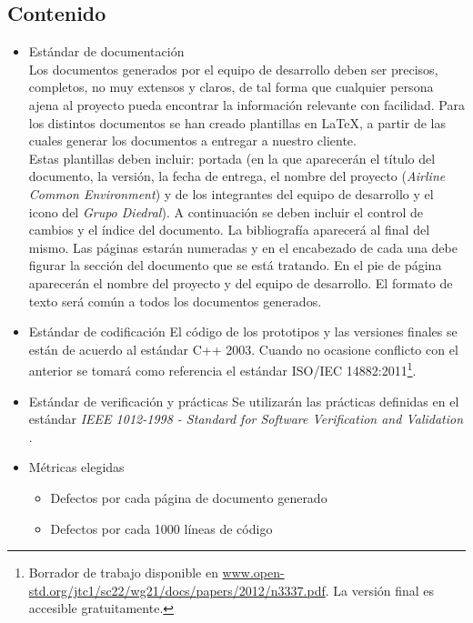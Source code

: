 \documentclass[11pt, a4paper, twoside, titlepage]{article}
\begin{document}
		\subsection{Contenido}
			\begin{itemize}
				\item Estándar de documentación\\
					Los documentos generados por el equipo de desarrollo deben ser precisos, completos, no muy extensos y claros, de tal forma que cualquier persona ajena al proyecto pueda encontrar la información relevante con facilidad. %
Para los distintos documentos se han creado plantillas en {\rmfamily\LaTeX{}}, a partir de las cuales generar los documentos a entregar a nuestro cliente.\\

					Estas plantillas deben incluir: portada (en la que aparecerán el título del documento, la versión, la fecha de entrega, el nombre del proyecto (\textit{Airline Common Environment}) y de los integrantes del equipo de desarrollo y el icono del \textit{Grupo Diedral}). A continuación se deben incluir el control de cambios y el índice del documento. La bibliografía aparecerá al final del mismo. Las páginas estarán numeradas y en el encabezado de cada una debe figurar la sección del documento que se está tratando. En el pie de página aparecerán el nombre del proyecto y del equipo de desarrollo. El formato de texto será común a todos los documentos generados.

				\item Estándar de  codificación %
					El código de los prototipos y las versiones finales se están de acuerdo al estándar C++ 2003. Cuando no ocasione conflicto con el anterior se tomará como referencia el estándar ISO/IEC 14882:2011\footnote{Borrador de trabajo disponible en \url{www.open-std.org/jtc1/sc22/wg21/docs/papers/2012/n3337.pdf}. La versión final es accesible gratuitamente.}.
					
				\item Estándar de verificación y prácticas
					Se utilizarán las prácticas definidas en el estándar \textit{IEEE 1012-1998 - Standard for Software Verification and Validation} \cite{IEEE1012-1998}.

				\item Métricas elegidas
					\begin{itemize}
						\item Defectos por cada página de documento generado
						\item Defectos por cada 1000 líneas de código
					\end{itemize}
			\end{itemize}
\end{document}
